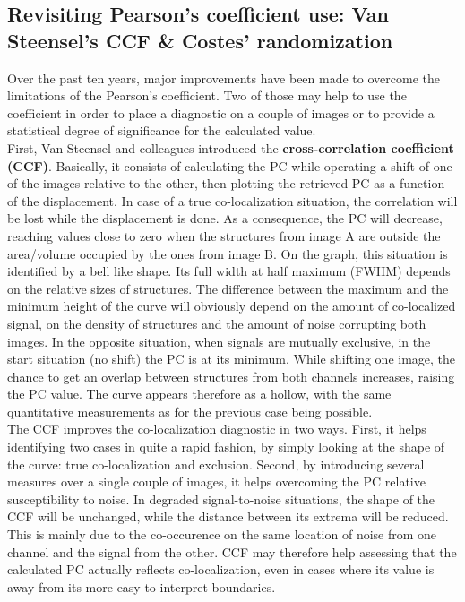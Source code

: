 \documentclass[]{spie}  %
\begin{document}
\subsection{Revisiting Pearson's coefficient use: Van Steensel's CCF \& Costes' randomization}
\label{sec:CCF_CRand}
Over the past ten years, major improvements have been made to overcome the limitations of the Pearson's coefficient. Two of those may help to use the coefficient in order to place a diagnostic on a couple of images or to provide a statistical degree of significance for the calculated value.\\
First, Van Steensel and colleagues\cite{VanSteensel1996} introduced the \textbf{cross-correlation coefficient (CCF)}. Basically, it consists of calculating the PC while operating a shift of one of the images relative to the other, then plotting the retrieved PC as a function of the displacement. In case of a true co-localization situation, the correlation will be lost while the displacement is done. As a consequence, the PC will decrease, reaching values close to zero when the structures from image A are outside the area/volume occupied by the ones from image B. On the graph, this situation is identified by a bell like shape. Its full width at half maximum (FWHM) depends on the relative sizes of structures. The difference between the maximum and the minimum height of the curve will obviously depend on the amount of co-localized signal, on the density of structures and the amount of noise corrupting both images. In the opposite situation, when signals are mutually exclusive, in the start situation (no shift) the PC is at its minimum. While shifting one image, the chance to get an overlap between structures from both channels increases, raising the PC value. The curve appears therefore as a hollow, with the same quantitative measurements as for the previous case being possible.\\
The CCF improves the co-localization diagnostic in two ways. First, it helps identifying two cases in quite a rapid fashion, by simply looking at the shape of the curve: true co-localization and exclusion. Second, by introducing several measures over a single couple of images, it helps overcoming the PC relative susceptibility to noise. In degraded signal-to-noise situations, the shape of the CCF will be unchanged, while the distance between its extrema will be reduced. This is mainly due to the co-occurence on the same location of noise from one channel and the signal from the other. CCF may therefore help assessing that the calculated PC actually reflects co-localization, even in cases where its value is away from its more easy to interpret boundaries.\\\\
\end{document}
